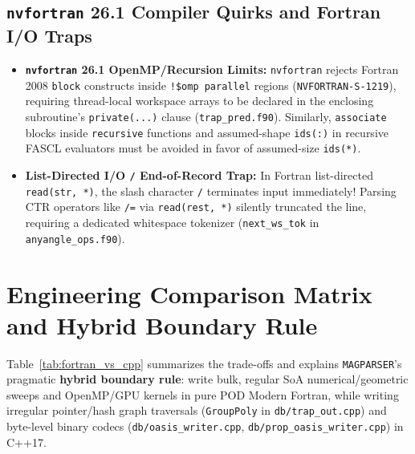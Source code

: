 \subsection{\texttt{nvfortran} 26.1 Compiler Quirks and Fortran I/O Traps}
\begin{itemize}
  \item \textbf{\texttt{nvfortran} 26.1 OpenMP/Recursion Limits:} \texttt{nvfortran} rejects Fortran 2008 \texttt{block} constructs inside \texttt{!\$omp parallel} regions (\texttt{NVFORTRAN-S-1219}), requiring thread-local workspace arrays to be declared in the enclosing subroutine's \texttt{private(...)} clause (\texttt{trap\_pred.f90}). Similarly, \texttt{associate} blocks inside \texttt{recursive} functions and assumed-shape \texttt{ids(:)} in recursive FASCL evaluators must be avoided in favor of assumed-size \texttt{ids(*)}.
  \item \textbf{List-Directed I/O \texttt{/} End-of-Record Trap:} In Fortran list-directed \texttt{read(str, *)}, the slash character \texttt{/} terminates input immediately! Parsing CTR operators like \texttt{/=} via \texttt{read(rest, *)} silently truncated the line, requiring a dedicated whitespace tokenizer (\texttt{next\_ws\_tok} in \texttt{anyangle\_ops.f90}).
\end{itemize}

\section{Engineering Comparison Matrix and Hybrid Boundary Rule}

Table~\ref{tab:fortran_vs_cpp} summarizes the trade-offs and explains \texttt{MAGPARSER}'s pragmatic \textbf{hybrid boundary rule}: write bulk, regular SoA numerical/geometric sweeps and OpenMP/GPU kernels in pure POD Modern Fortran, while writing irregular pointer/hash graph traversals (\texttt{GroupPoly} in \texttt{db/trap\_out.cpp}) and byte-level binary codecs (\texttt{db/oasis\_writer.cpp}, \texttt{db/prop\_oasis\_writer.cpp}) in C++17.


